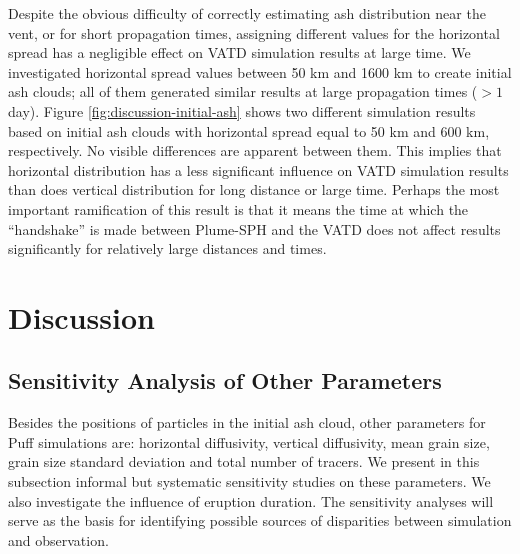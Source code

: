 \documentclass[utf8]{frontiersSCNS} %
\begin{document}
Despite the obvious difficulty of correctly estimating ash distribution near the vent, or for short propagation times, assigning different values for the horizontal spread has a negligible effect on VATD simulation results at large time. We investigated horizontal spread values between 50 km and 1600 km to create initial ash clouds; all of them generated similar results at large propagation times ($> 1$ day). Figure \ref{fig:discussion-initial-ash} shows two different simulation results based on initial ash clouds with horizontal spread equal to 50 km and 600 km, respectively. No visible differences are apparent between them. This implies that horizontal distribution has a less significant influence on VATD simulation results than does vertical distribution for long distance or large time.  Perhaps the most important ramification of this result is that it means the time at which the ``handshake'' is made between Plume-SPH and the VATD does not affect results significantly for relatively large distances and times.

\section{Discussion}
\subsection{Sensitivity Analysis of Other Parameters}

Besides the positions of particles in the initial ash cloud, other parameters for Puff simulations are: horizontal diffusivity, vertical diffusivity, mean grain size, grain size standard deviation and total number of tracers. We present in this subsection informal but systematic sensitivity studies on these parameters. We also investigate the influence of eruption duration. The sensitivity analyses will serve as the basis for identifying possible sources of disparities between simulation and observation.
\end{document}
